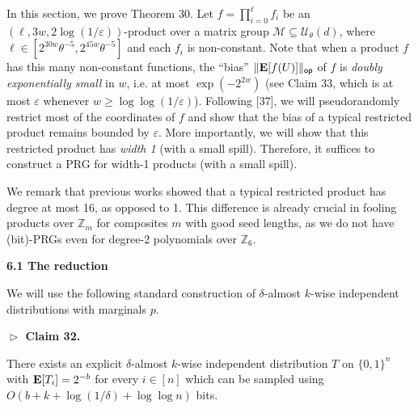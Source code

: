 \documentclass[10pt,a4paper]{article}
\begin{document}
In this section, we prove Theorem 30.
Let $f=\prod_{i=0}^{\ell}f_{i}$ be an $(\ell,3w,2\log(1/\varepsilon))$-product over a matrix group $\mathcal{M}\subseteq\mathcal{U}_{\theta}(d)$, where $\ell\in[2^{30w}\theta^{-5},2^{45w}\theta^{-5}]$ and each $f_{i}$ is non-constant.
Note that when a product $f$ has this many non-constant functions, the “bias” $\lVert\mathop{\bf E\/}[f(U)]\rVert_{\mathsf{op}}$ of $f$ is \emph{doubly exponentially small} in $w$, i.e. at most $\exp(-2^{2w})$ (see Claim 33, which is at most $\varepsilon$ whenever $w\geq\log\log(1/\varepsilon)$).
Following [37], we will pseudorandomly restrict most of the coordinates of $f$ and show that the bias of a typical restricted product remains bounded by $\varepsilon$.
More importantly, we will show that this restricted product has \emph{width 1} (with a small spill).
Therefore, it suffices to construct a PRG for width-1 products (with a small spill).\par




We remark that previous works showed that a typical restricted product has degree at most 16, as opposed to 1.
This difference is already crucial in fooling products over $\mathbb{Z}_{m}$ for composites $m$ with good seed lengths, as we do not have (bit)-PRGs even for degree-2 polynomials over $\mathbb{Z}_{6}$.\par




\par\medskip\noindent\textbf{
6.1 The reduction}\par




We will use the following standard construction of $\delta$-almost $k$-wise independent distributions with marginals $p$.\par





\par\medskip\noindent\textbf{
$\vartriangleright$ Claim 32. }\par



There exists an explicit $\delta$-almost $k$-wise independent distribution $T$ on $\{0,1\}^{n}$ with $\mathop{\bf E\/}[T_{i}]=2^{-b}$ for every $i\in[n]$ which can be sampled using $O(b+k+\log(1/\delta)+\log\log n)$ bits.\par
\end{document}
